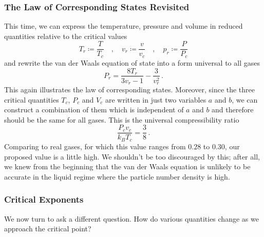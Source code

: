 \documentclass{article}
\theoremstyle{plain}\theoremheaderfont{\normalfont\bfseries}\theorembodyfont{\rmfamily}\theoremseparator{.}\newtheorem*{thm}{Theorem}\newtheorem*{law}{Law}\newtheorem*{pos}{Postulate}
\numberwithin{equation}{section}
\begin{document}
    \subsubsection*{The Law of Corresponding States Revisited}
    This time, we can express the temperature, pressure and volume in reduced quantities relative to the critical values
    \begin{equation}
        T_r\coloneqq\frac{T}{T_c}\quad,\quad v_r\coloneqq\frac{v}{v_c}\quad,\quad p_r\coloneqq\frac{P}{P_c}
    \end{equation}
    and rewrite the van der Waals equation of state into a form universal to all gases
    \begin{equation}
        P_r=\frac{8T_r}{3v_r-1}-\frac{3}{v_r^2}\,.
    \end{equation}
    This again illustrates the law of corresponding states. Moreover, since the three critical quantities \(T_c\), \(P_c\) and \(V_c\) are written in just two variables \(a\) and \(b\), we can construct a combination of them which is independent of \(a\) and \(b\) and therefore should be the same for all gases. This is the universal compressibility ratio
    \begin{equation}
        \frac{P_c v_c}{k_B T_c}=\frac{3}{8}\,.
    \end{equation}
    Comparing to real gases, for which this value ranges from \(0.28\) to \(0.30\), our proposed value is a little high. We shouldn't be too discouraged by this; after all, we knew from the beginning that the van der Waals equation is unlikely to be accurate in the liquid regime where the particle number density is high.

    \subsubsection*{Critical Exponents}
    We now turn to ask a different question. How do various quantities change as we approach the critical point?
\end{document}
